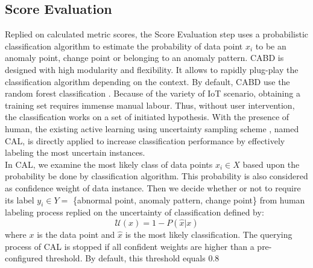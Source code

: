 \subsection{Score Evaluation}

Replied on calculated metric scores, the Score Evaluation step uses a probabilistic classification algorithm to estimate the probability of data point $ x_i $ to be an anomaly point, change point or belonging to an anomaly pattern. CABD is designed with high modularity and flexibility. It allows to rapidly plug-play the classification algorithm depending on the context. By default, CABD use the random forest classification \cite{liaw2002classification}. Because of the variety of IoT scenario, obtaining a training set requires immense manual labour. Thus, without user intervention, the classification works on a set of initiated hypothesis. With the presence of human, the existing active learning using uncertainty sampling scheme \cite{cohn1994improving}, named CAL, is directly applied to increase classification performance by effectively labeling the most uncertain instances.\\ %

In CAL, we examine the most likely class of data points $ x_i \in X $ based upon the probability be done by classification algorithm. This probability is also considered as confidence weight of data instance. Then we decide whether or not to require its label $ y_i \in Y= $ \{abnormal point, anomaly pattern, change point\}  from human labeling process replied on the uncertainty of classification defined by:
\begin{equation}\label{equation:uncertainty_score}
\mathcal{U}(x) = 1 - P(\hat{x}|x)
\end{equation}
where $ x $ is the data point and $ \hat{x} $ is the most likely classification. The querying process of CAL is stopped if all confident weights are higher than a pre-configured threshold. By default, this threshold equals 0.8\\

